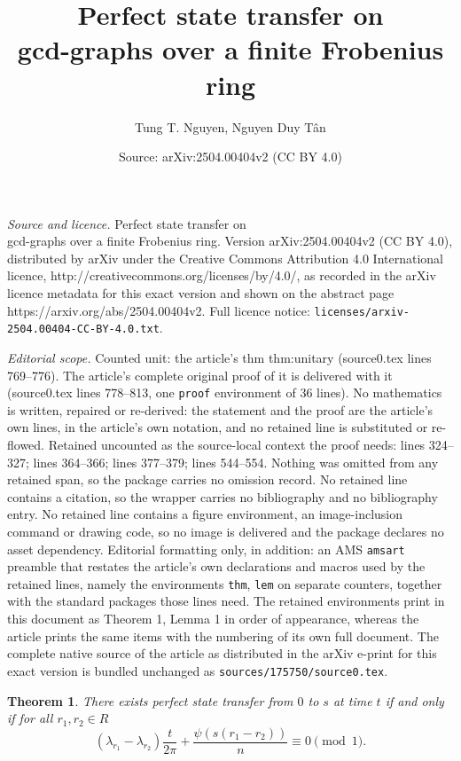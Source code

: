 \documentclass[10pt,a4paper]{amsart}
\title{Perfect state transfer on \\ gcd-graphs over a finite Frobenius ring}
\author{Tung T. Nguyen, Nguyen Duy T\^an}
\date{Source: arXiv:2504.00404v2 (CC BY 4.0)}
\newtheorem{thm}{Theorem}
\begin{document}
\maketitle

\noindent\emph{Source and licence.} Perfect state transfer on \\ gcd-graphs over a finite Frobenius ring. Version arXiv:2504.00404v2 (CC BY 4.0), distributed by arXiv under the Creative Commons Attribution 4.0 International licence, http://creativecommons.org/licenses/by/4.0/, as recorded in the arXiv licence metadata for this exact version and shown on the abstract page https://arxiv.org/abs/2504.00404v2. Full licence notice: \texttt{licenses/arxiv-2504.00404-CC-BY-4.0.txt}.\par\smallskip

\noindent\textit{Editorial scope.} Counted unit: the article's thm thm:unitary (source0.tex lines 769--776). The article's complete original proof of it is delivered with it (source0.tex lines 778--813, one \texttt{proof} environment of 36 lines). No mathematics is written, repaired or re-derived: the statement and the proof are the article's own lines, in the article's own notation, and no retained line is substituted or re-flowed.  Retained uncounted as the source-local context the proof needs: lines 324--327; lines 364--366; lines 377--379; lines 544--554.  Nothing was omitted from any retained span, so the package carries no omission record.  No retained line contains a citation, so the wrapper carries no bibliography and no bibliography entry.  No retained line contains a figure environment, an image-inclusion command or drawing code, so no image is delivered and the package declares no asset dependency.  Editorial formatting only, in addition: an AMS \texttt{amsart} preamble that restates the article's own declarations and macros used by the retained lines, namely the environments \texttt{thm}, \texttt{lem} on separate counters, together with the standard packages those lines need.  The retained environments print in this document as Theorem 1, Lemma 1 in order of appearance, whereas the article prints the same items with the numbering of its own full document.  The complete native source of the article as distributed in the arXiv e-print for this exact version is bundled unchanged as \texttt{sources/175750/source0.tex}.
\begin{thm} \label{prop:condition}
    There exists perfect state transfer from $0$ to $s$ at time $t$ if and only if for all $r_1, r_2 \in R$
    \[ (\lambda_{r_1}-\lambda_{r_2}) \frac{t}{2 \pi} + \frac{\psi(s(r_1-r_2))}{n} \equiv 0 \pmod{1}.\]
\end{thm}
\end{document}
